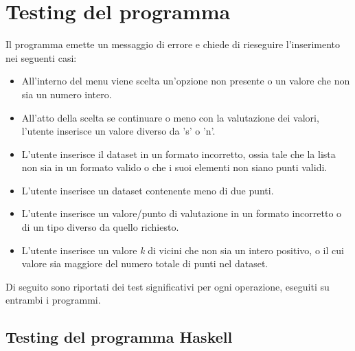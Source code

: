 \documentclass[11pt]{article}
\theoremstyle{definition}
\begin{document}
\section{Testing del programma}
Il programma emette un messaggio di errore e chiede di rieseguire l'inserimento nei seguenti casi:
\begin{itemize}
\item All'interno del menu viene scelta un'opzione non presente o un valore che non sia un numero intero.
\item All'atto della scelta se continuare o meno con la valutazione dei valori, l'utente inserisce un valore diverso da 's' o 'n'.
\item L'utente inserisce il dataset in un formato incorretto, ossia tale che la lista non sia in un formato valido o che i suoi elementi non siano punti validi. 
\item L'utente inserisce un dataset contenente meno di due punti.
\item L'utente inserisce un valore/punto di valutazione in un formato incorretto o di un tipo diverso da quello richiesto.
\item L'utente inserisce un valore \textit{k} di vicini che non sia un intero positivo, o il cui valore sia maggiore del numero totale di punti nel dataset.
\end{itemize}
Di seguito sono riportati dei test significativi per ogni operazione, eseguiti su entrambi i programmi. 

\subsection{Testing del programma Haskell}
\end{document}
